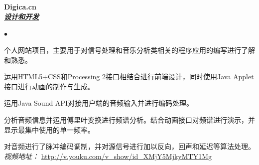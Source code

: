 \documentclass[UTF8]{ctexart}
\newcommand{\lineunder}{\vspace*{-8pt} \\
\hspace*{-18pt} \hrulefill \\}
\newcommand{\header}[1]{\large \vspace*{12pt}{\Large \hspace*{-15pt}\vspace*{6pt} \textsc{#1}} \vspace*{-6pt} \lineunder}
\newcommand{\website}[3]{{\normalsize \textbf{#1}\\
\underline{\textbf{\emph{#3}}}\\
}}
\newenvironment{achievements}{
\begin{list}
        {$\bullet$}{\topsep 0pt
        \itemsep 0pt}}{\vspace*{4pt}
\end{list}
}
\begin{document}
\header{网站项目}
\website{Digica.cn}{}{设计和开发}
\begin{achievements}
    \item 个人网站项目，主要用于对信号处理和音乐分析类相关的程序应用的编写进行了解和熟悉。
    \item 运用HTML5+CSS和Processing 2接口相结合进行前端设计，同时使用Java Applet接口进行动画的制作与生成。
    \item 运用Java Sound API对接用户端的音频输入并进行编码处理。
    \item 分析音频信息并运用傅里叶变换进行频谱分析。结合动画接口对频谱进行演示，并显示最集中使用的单一频率。
    \item 对音频进行了脉冲编码调制，并对源信号进行加以反向，回声和延迟等算法处理。\\ \vspace*{6pt}
    \emph{视频地址：} \url{http://v.youku.com/v_show/id_XMjY5MjkyMTY1Mg}
\end{achievements}
\end{document}
